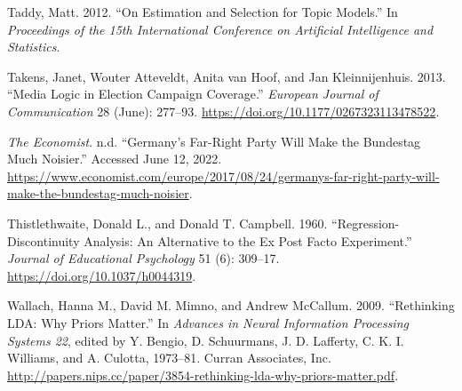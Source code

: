 \documentclass[
  12pt,
]{article}
\newlength{\cslhangindent}
\newlength{\cslentryspacingunit} %
\newenvironment{CSLReferences}[2] %
 {%
  \setlength{\parindent}{0pt}
  \ifodd #1
  \let\oldpar\par
  \def\par{\hangindent=\cslhangindent\oldpar}
  \fi
  \setlength{\parskip}{#2\cslentryspacingunit}
 }%
 {}
\begin{document}
\begin{CSLReferences}{1}{0}
\leavevmode{}%
Taddy, Matt. 2012. {``On Estimation and Selection for Topic Models.''}
In \emph{Proceedings of the 15th {International Conference} on
{Artificial Intelligence} and {Statistics}}.

\leavevmode{}%
Takens, Janet, Wouter Atteveldt, Anita van Hoof, and Jan Kleinnijenhuis.
2013. {``Media Logic in Election Campaign Coverage.''} \emph{European
Journal of Communication} 28 (June): 277--93.
\url{https://doi.org/10.1177/0267323113478522}.

\leavevmode{}%
\emph{The Economist}. n.d. {``Germany's Far-Right Party Will Make the
{Bundestag} Much Noisier.''} Accessed June 12, 2022.
\url{https://www.economist.com/europe/2017/08/24/germanys-far-right-party-will-make-the-bundestag-much-noisier}.

\leavevmode{}%
Thistlethwaite, Donald L., and Donald T. Campbell. 1960.
{``Regression-Discontinuity Analysis: {An} Alternative to the Ex Post
Facto Experiment.''} \emph{Journal of Educational Psychology} 51 (6):
309--17. \url{https://doi.org/10.1037/h0044319}.

\leavevmode{}%
Wallach, Hanna M., David M. Mimno, and Andrew McCallum. 2009.
{``Rethinking {LDA}: {Why Priors Matter}.''} In \emph{Advances in
{Neural Information Processing Systems} 22}, edited by Y. Bengio, D.
Schuurmans, J. D. Lafferty, C. K. I. Williams, and A. Culotta, 1973--81.
{Curran Associates, Inc.}
\url{http://papers.nips.cc/paper/3854-rethinking-lda-why-priors-matter.pdf}.

\end{CSLReferences}
\end{document}
